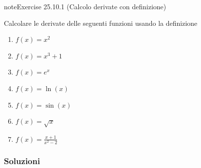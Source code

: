\documentclass[letterpaper,10pt,italian]{jupyterBook}
\begin{document}
\begin{sphinxadmonition}{note}{Exercise 25.10.1 (Calcolo derivate con definizione)}



\sphinxAtStartPar
Calcolare le derivate delle seguenti funzioni usando la definizione
\begin{enumerate}
%
\item {} 
\sphinxAtStartPar
\(f(x) = x^2\)

\item {} 
\sphinxAtStartPar
\(f(x) = x^3+1\)

\item {} 
\sphinxAtStartPar
\(f(x) = e^x\)

\item {} 
\sphinxAtStartPar
\(f(x) = \ln(x)\)

\item {} 
\sphinxAtStartPar
\(f(x) = \sin(x)\)

\item {} 
\sphinxAtStartPar
\(f(x) = \sqrt{x}\)

\item {} 
\sphinxAtStartPar
\(f(x) = \frac{x+1}{x^2-2}\)

\end{enumerate}

\sphinxAtStartPar
{}
\end{sphinxadmonition}
\subsubsection*{Soluzioni}
\end{document}
